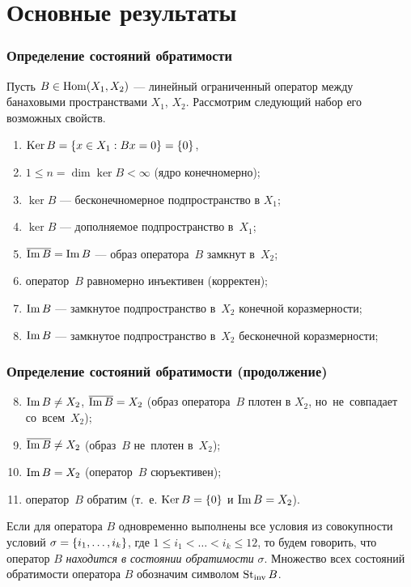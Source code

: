 \documentclass{beamer}
\begin{document}
\section{Основные результаты}
\begin{frame}
\frametitle{Определение состояний обратимости}

\begin{definition}
    Пусть $B \in \operatorname{Hom}(X_1, X_2)$ --- линейный ограниченный оператор между банаховыми пространствами $X_1$, $X_2$. Рассмотрим следующий набор его возможных свойств.
    \begin{enumerate}
        \setlength\itemsep{0em}
        \item $\operatorname{Ker} B = \left\{x \in X_1 : Bx = 0\right\} = \left\{0\right\}$,
        \item $1 \leq n = \dim \ker B < \infty$ (ядро конечномерно);
        \item $\ker B$ --- бесконечномерное подпространство в $X_1$;
        \item $\ker B$ --- дополняемое подпространство в~$X_1$;
        \item $\overline{\operatorname{Im} B} = \operatorname{Im} B$ --- образ оператора~$B$ замкнут в~$X_2$;
        \item оператор~$B$ равномерно инъективен (корректен);
        \item $\operatorname{Im} B$ --- замкнутое подпространство в~$X_2$ конечной коразмерности;
        \item $\operatorname{Im} B$ --- замкнутое подпространство в~$X_2$ бесконечной коразмерности;
    \end{enumerate}
\end{definition}

\end{frame}

\begin{frame}
\frametitle{Определение состояний обратимости (продолжение)}

\begin{definition}
    \begin{enumerate}
        \setcounter{enumi}{7}
        \setlength\itemsep{0em}
        \item $\operatorname{Im} B \neq X_2$, $\overline{\operatorname{Im} B} = X_2$ (образ оператора~$B$ плотен в $X_2$, но~не~совпадает со~всем~$X_2$);
        \item $\overline{\operatorname{Im} B} \neq X_2$ (образ~$B$ не~плотен в~$X_2$);
        \item $\operatorname{Im} B = X_2$ (оператор~$B$ сюръективен);
        \item оператор~$B$ обратим (т.~е. $\operatorname{Ker} B = \left\{0\right\}$ и $\operatorname{Im} B = X_2$).
    \end{enumerate}
    Если для оператора $B$ одновременно выполнены все условия из совокупности условий $\sigma \hm= \menge{i_1, \dotsc, i_k}$, где $1 \leq i_1 < \dotsc < i_k \leq 12$, то будем говорить, что оператор $B$ \emph{находится в состоянии обратимости} $\sigma$. Множество всех состояний обратимости оператора $B$ обозначим символом $\operatorname{St_{inv}} B$.
\end{definition}

\end{frame}
\end{document}
